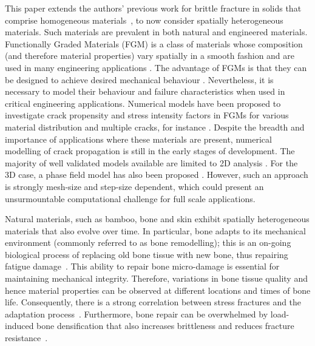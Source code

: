 \documentclass[onecolumn]{svjour3}
\begin{document}
This paper extends the authors' previous work for brittle fracture in solids that comprise homogeneous materials~\cite{kaczmarczyk2017energy}, 
to now consider spatially heterogeneous materials. 
Such materials are prevalent in both natural and engineered materials. 
Functionally Graded Materials (FGM) is a class of materials whose composition (and therefore material properties) 
vary spatially in a smooth fashion \cite{KawasakiWatanabe1997} and are used in many engineering 
applications \cite{Jha2013, NaebeShirvan2016}.
The advantage of FGMs is that they can be designed to achieve desired mechanical behaviour \cite{Erdogan1995, FinotSuresh1996}. 
Nevertheless, it is necessary to model their behaviour and failure characteristics when used in critical engineering applications. 
Numerical models have been proposed to investigate crack propensity and stress intensity factors in FGMs for various material distribution 
and multiple cracks, for instance \cite{KimPaulino2002, Ayhan2009, ZhangBEM2011, ShiMan2014, ShojaeeDaneshmand2015}. 
Despite the breadth and importance of applications where these materials are present, 
numerical modelling of crack propagation is still in the early stages of development.
The majority of well validated models available are limited to 2D analysis \cite{KimPaulino2004,Bayesteh2013, Ooi2015, Chafi2019}.
For the 3D case, a phase field model has also been proposed \cite{Hirshikesh2019}.
However, such an approach is strongly mesh-size and step-size dependent, 
which could present an unsurmountable computational challenge for full scale  applications.

Natural materials, such as bamboo, bone and skin exhibit spatially heterogeneous materials that also evolve over time. 
In particular, bone adapts to its mechanical environment (commonly referred to as bone remodelling); 
this is an on-going biological process of replacing old bone tissue with new bone, thus repairing fatigue damage~\cite{hughes2017role}. 
This ability to repair bone micro-damage is essential for maintaining mechanical integrity. 
Therefore, variations in bone tissue quality and hence material properties can be observed at different locations and times of bone life. 
Consequently, there is a strong correlation between stress fractures and the adaptation process~\cite{hughes2017role}. 
Furthermore, bone repair can be overwhelmed by load-induced bone densification that also increases brittleness and reduces fracture resistance~\cite{loughridge2017qualitative}.
\end{document}
